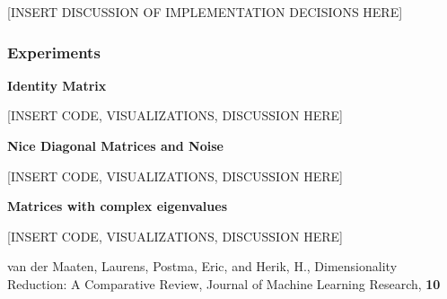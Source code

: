 \documentclass[onecolumn]{webofc}
\begin{document}
[INSERT DISCUSSION OF IMPLEMENTATION DECISIONS HERE]

\subsubsection*{Experiments}
\textbf{Identity Matrix}

[INSERT CODE, VISUALIZATIONS, DISCUSSION HERE]

\textbf{Nice Diagonal Matrices and Noise}

[INSERT CODE, VISUALIZATIONS, DISCUSSION HERE]

\textbf{Matrices with complex eigenvalues}

[INSERT CODE, VISUALIZATIONS, DISCUSSION HERE]


 \begin{thebibliography}{9}

van der Maaten, Laurens, Postma, Eric, and Herik, H., Dimensionality Reduction: A Comparative Review, Journal of Machine Learning Research, \textbf{10}


 \end{thebibliography}
\end{document}

